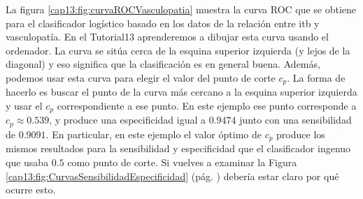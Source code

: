 \begin{ejemplo}
\label{cap13:ejem:curvaROC2}

La figura \ref{cap13:fig:curvaROCVasculopatia} muestra la curva ROC que se obtiene para el clasificador logístico basado en los datos de la relación entre itb y vasculopatía. En el Tutorial13 aprenderemos a dibujar esta curva usando el ordenador. La curva se sitúa cerca de la esquina superior izquierda (y lejos de la diagonal) y eso significa que la clasificación es en general buena. Además, podemos usar esta curva para elegir el valor del punto de corte $c_p$. La forma de hacerlo es buscar el punto de la curva más cercano a la esquina superior izquierda y usar el $c_p$ correspondiente a ese punto. En este ejemplo ese punto corresponde a $c_p \approx 0.539$, y produce una especificidad igual a $0.9474$ junto con una sensibilidad de $0.9091$.  En particular, en este ejemplo el valor óptimo de $c_p$ produce los mismos resultados para la sensibilidad y especificidad que el clasificador ingenuo que usaba $0.5$ como punto de corte. Si vuelves a examinar la Figura \ref{cap13:fig:CurvasSensibilidadEspecificidad} (pág. \pageref{cap13:fig:CurvasSensibilidadEspecificidad}) debería estar claro por qué ocurre esto.


\end{ejemplo}
